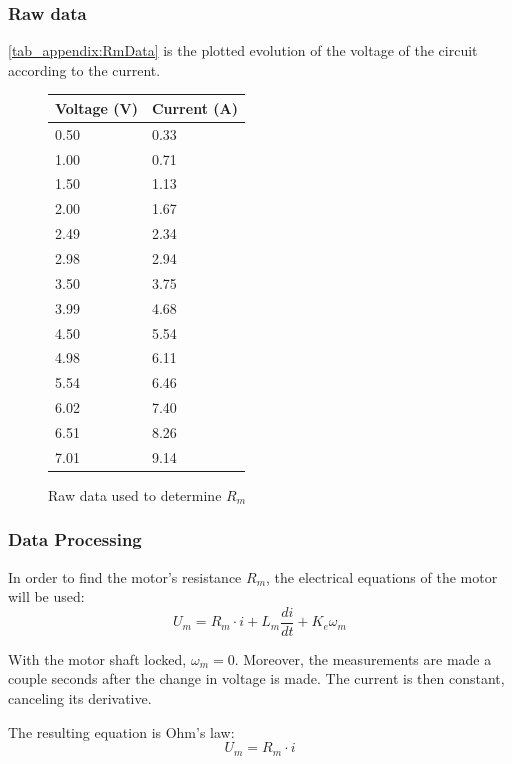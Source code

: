 \subsubsection*{Raw data}
\autoref{tab_appendix:RmData} is the plotted evolution of the voltage of the circuit according to the current.

\begin{figure}[htbp]
	\centering
	\caption{Raw data used to determine $R_m$}\label{tab_appendix:RmData}
	\begin{tabularx}{0.35\textwidth}{XX}
		Voltage (V) & Current (A)\\ \toprule \rowcolor{lightGrey}
		0.50 & 0.33 \\
		1.00 & 0.71 \\ \rowcolor{lightGrey}
		1.50 & 1.13 \\
		2.00 & 1.67 \\ \rowcolor{lightGrey}
		2.49 & 2.34 \\
		2.98 & 2.94 \\ \rowcolor{lightGrey}
		3.50 & 3.75 \\
		3.99 & 4.68 \\ \rowcolor{lightGrey}
		4.50 & 5.54 \\
		4.98 & 6.11 \\ \rowcolor{lightGrey}
		5.54 & 6.46 \\
		6.02 & 7.40 \\ \rowcolor{lightGrey}
		6.51 & 8.26 \\
		7.01 & 9.14 
	\end{tabularx}
\end{figure}

\subsubsection{Data Processing}
In order to find the motor's resistance $R_m$, the electrical equations of the motor will be used:
\begin{equation}
	U_m = R_m \cdot i + L_m \frac{di}{dt} + K_e\omega_m
\end{equation}

With the motor shaft locked, $\omega_m = 0$. Moreover, the measurements are made a couple seconds after the change in voltage is made. The current is then constant, canceling its derivative. 

The resulting equation is Ohm's law:
\begin{equation}
U_m = R_m \cdot i
\end{equation}


